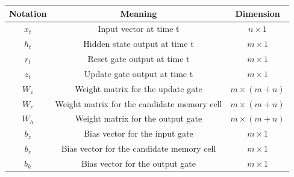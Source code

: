 \documentclass[12pt,a4paper]{article}
\begin{document}
\begin{longtable}{|c|c|c|}
    \hline
    \textbf{Notation} & \textbf{Meaning} & \textbf{Dimension}\\
    \hline
    $x_t$               & Input vector at time t                        & $n \times 1$\\
    $h_t$               & Hidden state output at time t                 & $m \times 1$\\
    $r_t$               & Reset gate output at time t                   & $m \times 1$\\
    $z_t$               & Update gate output at time t                  & $m \times 1$\\
    $W_z$               & Weight matrix for the update gate             & $m \times (m+n)$\\
    $W_r$               & Weight matrix for the candidate memory cell   & $m \times (m+n)$\\
    $W_h$               & Weight matrix for the output gate             & $m \times (m+n)$\\
    $b_z$               & Bias vector for the input gate                & $m \times 1$\\
    $b_r$               & Bias vector for the candidate memory cell     & $m \times 1$\\
    $b_h$               & Bias vector for the output gate               & $m \times 1$\\
    \hline
\end{longtable}
\end{document}
